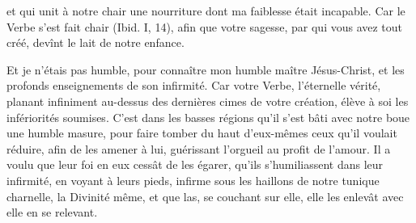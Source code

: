 \documentclass[french,twoside]{book} %
\begin{document}
\noindent et qui unit à notre chair une nourriture dont ma faiblesse était incapable. Car le Verbe s’est fait chair (Ibid. I, 14), afin que votre sagesse, par qui vous avez tout créé, devînt le lait de notre enfance.\par
Et je n’étais pas humble, pour connaître mon humble maître Jésus-Christ, et les profonds enseignements de son infirmité. Car votre Verbe, l’éternelle vérité, planant infiniment au-dessus des dernières cimes de votre création, élève à soi les infériorités soumises. C’est dans les basses régions qu’il s’est bâti avec notre boue une humble masure, pour faire tomber du haut d’eux-mêmes ceux qu’il voulait réduire, afin de les amener à lui, guérissant l’orgueil au profit de l’amour. Il a voulu que leur foi en eux cessât de les égarer, qu’ils s’humiliassent dans leur infirmité, en voyant à leurs pieds, infirme sous les haillons de notre tunique charnelle, la Divinité même, et que las, se couchant sur elle, elle les enlevât avec elle en se relevant.
\end{document}
